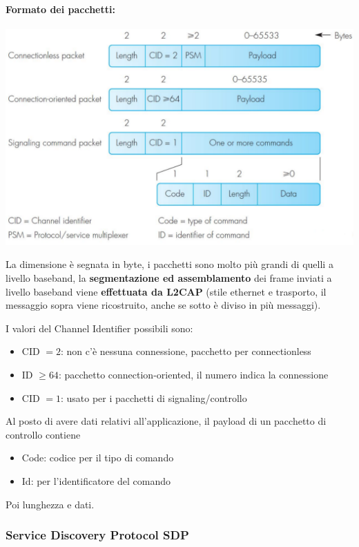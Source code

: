 \paragraph{Formato dei pacchetti:}
\begin{center}
	\includegraphics[width=0.9\linewidth]{img/wpan/l2cappacket}
\end{center}
La dimensione è segnata in byte, i pacchetti sono molto più grandi di quelli a livello baseband, la \textbf{segmentazione ed assemblamento} dei frame inviati a livello baseband viene \textbf{effettuata da L2CAP} (stile ethernet e trasporto, il messaggio sopra viene ricostruito, anche se sotto è diviso in più messaggi).\\

\newpage

I valori del Channel Identifier possibili sono: 
\begin{itemize}
	\item CID $= 2$: non c'è nessuna connessione, pacchetto per connectionless
	\item ID $\geq 64$: pacchetto connection-oriented, il numero indica la connessione
	\item CID $=1$: usato per i pacchetti di signaling/controllo
\end{itemize}

Al posto di avere dati relativi all'applicazione, il payload di un pacchetto di controllo contiene
\begin{itemize}
	\item Code: codice per il tipo di comando 
	\item Id: per l'identificatore del comando
\end{itemize}
Poi lunghezza e dati.\\

\subsubsection{Service Discovery Protocol SDP}

